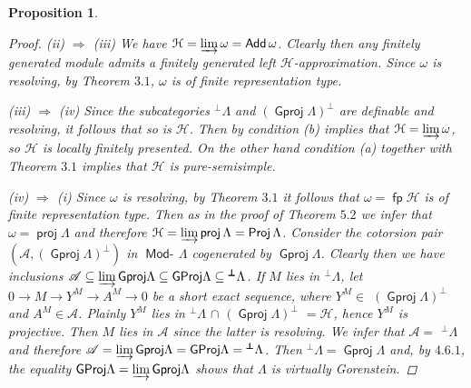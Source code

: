 \documentclass[oneside, a4paper,reqno]{amsart}
\numberwithin{equation}{section}
\newtheorem{prop}[thm]{Proposition}
\theoremstyle{definition}
\begin{document}
\begin{prop}
\begin{proof}
(ii) $\Rightarrow$ (iii) We have $\mathcal H = \operatorname*{\varinjlim}\omega =
\operatorname*{\mathsf{Add}}\omega$. Clearly then any finitely generated module admits a
finitely generated left $\mathcal H$-approximation. Since $\omega$
is resolving, by Theorem $3.1$, $\omega$ is of finite representation
type.

(iii) $\Rightarrow$ (iv) Since the subcategories
${^{\pmb{\bot}}}\Lambda$ and $({\operatorname{\mathsf{Gproj}}\nolimits}\Lambda)^{\pmb{\bot}}$ are
definable and resolving, it follows that so is $\mathcal H$. Then by
\cite{Krause:memoirs} condition (b) implies that $\mathcal H =
\operatorname*{\varinjlim}\omega$, so $\mathcal H$ is locally finitely presented. On the
other hand condition (a) together with Theorem $3.1$  implies that
$\mathcal H$ is pure-semisimple.

(iv) $\Rightarrow$ (i) Since $\omega$ is resolving, by Theorem $3.1$
it follows that $\omega = \operatorname*{\mathsf{fp}}\mathcal H$ is of finite representation
type. Then as in the proof of Theorem $5.2$ we infer that $\omega =
\operatorname*{\mathsf{proj}}\Lambda$ and therefore $\mathcal H = \operatorname*{\varinjlim}\operatorname*{\mathsf{proj}}\Lambda =
\operatorname*{\mathsf{Proj}}\Lambda$. Consider the cotorsion pair
$({\mathscr A},({\operatorname{\mathsf{Gproj}}\nolimits}\Lambda)^{\pmb{\bot}})$ in $\operatorname*{\mathsf{Mod}-\!}\Lambda$ cogenerated by
${\operatorname{\mathsf{Gproj}}\nolimits}\Lambda$. Clearly then we have inclusions ${\mathscr A} \subseteq
\operatorname*{\varinjlim}{\operatorname{\mathsf{Gproj}}\nolimits}\Lambda \subseteq {\operatorname{\mathsf{GProj}}\nolimits}\Lambda \subseteq
{^{\pmb{\bot}}}\Lambda$. If $M$ lies in ${^{\pmb{\bot}}}\Lambda$,
let $0 {\longrightarrow} M {\longrightarrow} Y^{M} {\longrightarrow} A^{M} {\longrightarrow} 0$ be a short exact
sequence, where $Y^{M} \in$ $({\operatorname{\mathsf{Gproj}}\nolimits}\Lambda)^{\pmb\bot}$ and $A^{M}
\in {\mathscr A}$. Plainly $Y^{M}$ lies in ${^{\pmb{\bot}}}\Lambda$ $\cap$
$({\operatorname{\mathsf{Gproj}}\nolimits}\Lambda)^{\pmb\bot}$ $= \mathcal H$, hence $Y^{M}$ is
projective. Then $M$ lies in ${\mathscr A}$ since the latter is resolving. We
infer that ${\mathscr A} =$ ${^{\pmb{\bot}}}\Lambda$ and therefore ${\mathscr A} =
\operatorname*{\varinjlim}{\operatorname{\mathsf{Gproj}}\nolimits}\Lambda = {\operatorname{\mathsf{GProj}}\nolimits}\Lambda = {^{\pmb{\bot}}}\Lambda$. Then
${^{\bot}}\Lambda = {\operatorname{\mathsf{Gproj}}\nolimits}\Lambda$ and, by $4.6.1$, the equality
${\operatorname{\mathsf{GProj}}\nolimits}\Lambda = \operatorname*{\varinjlim}{\operatorname{\mathsf{Gproj}}\nolimits}\Lambda$ shows that $\Lambda$ is
virtually Gorenstein.
\end{proof}
\end{prop}
\end{document}
